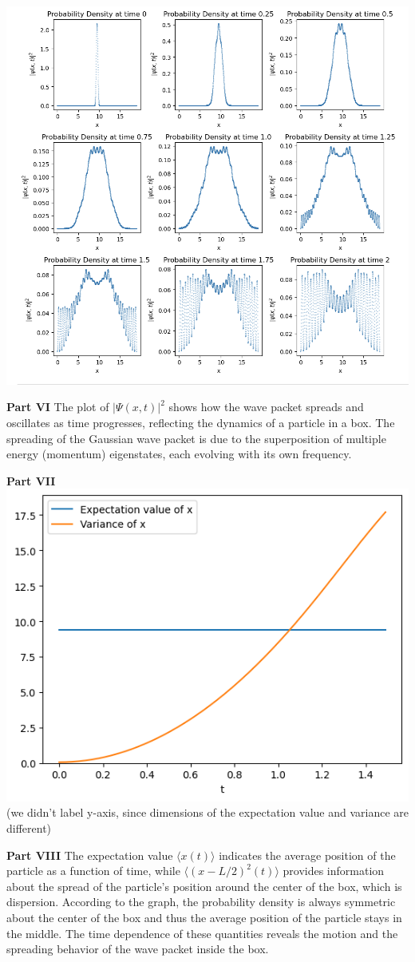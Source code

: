 \documentclass{article}
\begin{document}
\begin{adjustwidth}{5pt}{5pt}
\includegraphics[width=0.6\linewidth]{partVMASTER.png}
\vspace{0.2cm}
\item[] \textbf{Part VI} The plot of $|\Psi(x, t)|^2$ shows how the wave packet spreads and oscillates as time progresses, reflecting the dynamics of a particle in a box. The spreading of the Gaussian wave packet is due to the superposition of multiple energy (momentum) eigenstates, each evolving with its own frequency.
    
\vspace{0.2cm}
\item[] \textbf{Part VII}\\
\includegraphics[width=0.5\linewidth]{2-b-vii.png}\\
(we didn't label y-axis, since dimensions of the expectation value and variance are different)

\vspace{0.2cm}
\item[] \textbf{Part VIII} The expectation value $\langle x(t) \rangle$ indicates the average position of the particle as a function of time, while $\langle (x - L/2)^2(t) \rangle$ provides information about the spread of the particle's position around the center of the box, which is dispersion. According to the graph, the probability density is always symmetric about the center of the box and thus the average position of the particle stays in the middle. The time dependence of these quantities reveals the motion and the spreading behavior of the wave packet inside the box.
\end{adjustwidth}
\end{document}
